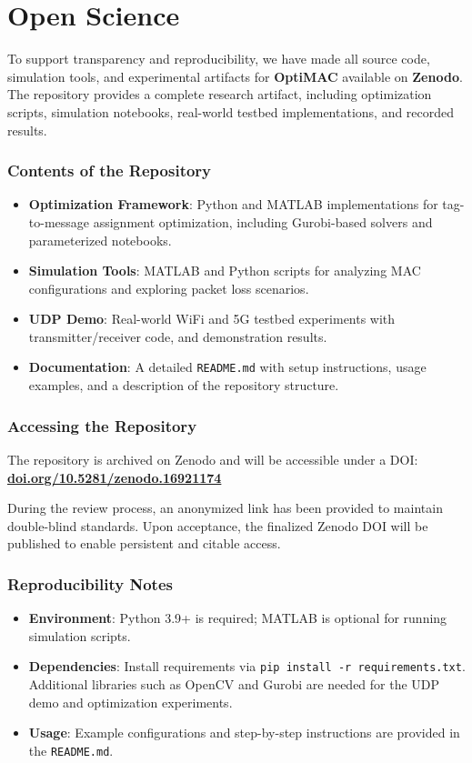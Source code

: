 
\section*{Open Science}
To support transparency and reproducibility, we have made all source code, simulation tools, and experimental artifacts for \textbf{OptiMAC} available on \textbf{Zenodo}. The repository provides a complete research artifact, including optimization scripts, simulation notebooks, real-world testbed implementations, and recorded results.

\subsubsection*{Contents of the Repository}
\begin{itemize}
    \item \textbf{Optimization Framework}: Python and MATLAB implementations for tag-to-message assignment optimization, including Gurobi-based solvers and parameterized notebooks.
    \item \textbf{Simulation Tools}: MATLAB and Python scripts for analyzing MAC configurations and exploring packet loss scenarios.
    \item \textbf{UDP Demo}: Real-world WiFi and 5G testbed experiments with transmitter/receiver code, and demonstration results.
    \item \textbf{Documentation}: A detailed \texttt{README.md} with setup instructions, usage examples, and a description of the repository structure.
\end{itemize}

\subsubsection*{Accessing the Repository}
The repository is archived on Zenodo and will be accessible under a DOI: \textbf{\href{https://doi.org/10.5281/zenodo.16921174}{doi.org/10.5281/zenodo.16921174}}

During the review process, an anonymized link has been provided to maintain double-blind standards. Upon acceptance, the finalized Zenodo DOI will be published to enable persistent and citable access. 

\subsubsection*{Reproducibility Notes}
\begin{itemize}
    \item \textbf{Environment}: Python 3.9+ is required; MATLAB is optional for running simulation scripts.
    \item \textbf{Dependencies}: Install requirements via \texttt{pip install -r requirements.txt}. Additional libraries such as OpenCV and Gurobi are needed for the UDP demo and optimization experiments.
    \item \textbf{Usage}: Example configurations and step-by-step instructions are provided in the \texttt{README.md}.
\end{itemize}
